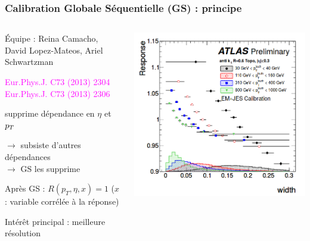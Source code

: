 \begin{frame}
\frametitle{Calibration Globale S\'equentielle (GS) : principe}
\begin{columns}
\begin{column}{0.75\textwidth}
\begin{small}
\begin{maliste}
\item \'Equipe : Reina Camacho, David Lopez-Mateos, Ariel Schwartzman
\vspace*{0.2cm}
\item \textcolor{magenta}{Eur.Phys.J. C73 (2013) 2304}\\
\textcolor{magenta}{Eur.Phys.J. C73 (2013) 2306}
\vspace*{0.2cm}
\item \EMJES{} supprime dépendance en $\eta$ et $p_T$
\begin{center}
$\rightarrow$ subsiste d'autres dépendances\\
$\rightarrow$ GS les supprime
\end{center}
\item Apr\`es GS : $R(p_T,\eta,x)=1$ ($x$ : variable corr\'el\'ee \`a la r\'eponse)
\vspace*{0.2cm}
\item Int\'er\^et principal : meilleure r\'esolution
\end{maliste}
\end{small}
\end{column}
\begin{column}{0.3\textwidth}
\begin{center}
\hspace*{-0.5cm}
\includegraphics[scale=0.185]{Figures/JES/responseDependenceWidthIllustration.png}
\end{center}
\end{column}
\end{columns}
\end{frame}

